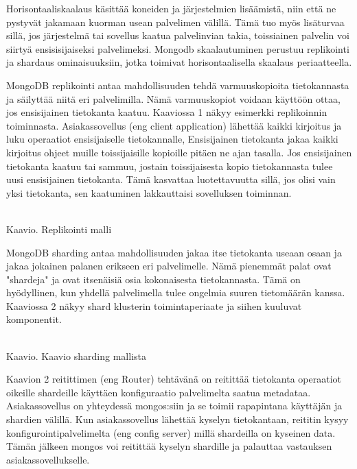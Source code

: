 Horisontaaliskaalaus käsittää koneiden ja järjestelmien lisäämistä, niin että ne pystyvät jakamaan kuorman usean palvelimen välillä.
Tämä tuo myös lisäturvaa sillä, jos järjestelmä tai sovellus kaatua palvelinvian takia, 
toissiainen palvelin voi siirtyä ensisisijaiseksi palvelimeksi. 
Mongodb skaalautuminen perustuu replikointi ja shardaus ominaisuuksiin, jotka toimivat horisontaalisella skaalaus periaatteella. 
\medskip




MongoDB replikointi antaa mahdollisuuden tehdä varmuuskopioita tietokannasta ja säilyttää niitä eri palvelimilla.
Nämä varmuuskopiot voidaan käyttöön ottaa, jos ensisijainen tietokanta kaatuu. 
Kaaviossa 1 näkyy esimerkki replikoinnin toiminnasta. 
Asiakassovellus (eng client application) lähettää kaikki kirjoitus ja luku operaatiot ensisijaiselle tietokannalle, 
Ensisijainen tietokanta jakaa kaikki kirjoitus ohjeet muille toissijaisille kopioille pitäen ne ajan tasalla.
Jos ensisijainen tietokanta kaatuu tai sammuu, jostain toissijaisesta kopio tietokannasta tulee uusi ensisijainen tietokanta.
Tämä kasvattaa luotettavuutta sillä, jos olisi vain yksi tietokanta, sen kaatuminen lakkauttaisi sovelluksen toiminnan. 
\medskip
\bigskip

\\
Kaavio\getChartCount{}. Replikointi malli 
\medskip



MongoDB sharding antaa mahdollisuuden jakaa itse tietokanta useaan osaan ja jakaa jokainen palanen erikseen eri palvelimelle.
Nämä pienemmät palat ovat "shardeja"{} ja ovat itsenäisiä osia kokonaisesta tietokannasta.
Tämä on hyödyllinen, kun yhdellä palvelimella tulee ongelmia suuren tietomäärän kanssa.
Kaaviossa 2 näkyy shard klusterin toimintaperiaate ja siihen kuuluvat komponentit. 
\medskip



\bigskip
\\
Kaavio\getChartCount{}. Kaavio sharding mallista 
\medskip




Kaavion 2 reitittimen (eng Router) tehtävänä on reitittää tietokanta operaatiot oikeille shardeille käyttäen konfiguraatio palvelimelta saatua metadataa.
Asiakassovellus on yhteydessä mongos:siin ja se toimii rapapintana käyttäjän ja shardien välillä. 
Kun asiakassovellus lähettää kyselyn tietokantaan, reititin kysyy konfigurointipalvelimelta (eng config server) millä shardeilla on kyseinen data. 
Tämän jälkeen mongos voi reitittää kyselyn shardille ja palauttaa vastauksen asiakassovellukselle.
\medskip

